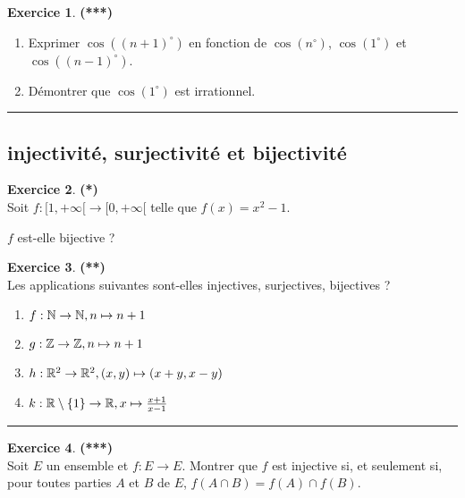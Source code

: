 \documentclass[a4paper,11pt]{article}
\theoremstyle{definition}
\newtheorem{exo}{Exercice} %
\begin{document}
\begin{minipage}{1\linewidth}
\begin{minipage}[t]{0.48\linewidth}
\begin{exo}\textbf{(***)}\quad\\[0.2cm]%
	\begin{enumerate}
		\item Exprimer $\cos((n+1)^\circ)$ en fonction de $\cos(n^\circ)$, $\cos(1^\circ)$ et $\cos((n-1)^\circ)$.
		\item Démontrer que $\cos(1^\circ)$	est irrationnel. 
	\end{enumerate}
	
	\centering
	\rule{1\linewidth}{0.6pt}
\end{exo}

\subsection*{injectivité, surjectivité et bijectivité}
\begin{exo}\textbf{(*)}\quad\\[0.2cm]
	Soit $f  : [1,+\infty[\rightarrow[0,+\infty[$ telle que
	$f(x)=x^2-1$. 
	
	$f$ est-elle bijective ?

\end{exo}



	\end{minipage}	
\hfill\vrule\hfill
\begin{minipage}[t]{0.48\linewidth}
\raggedright


\begin{exo}\textbf{(**)}\quad\\[0.2cm]
	Les applications suivantes sont-elles injectives, surjectives, bijectives ?
	\begin{enumerate}
		\item $f : {\mathbb{N}} \to {\mathbb{N}}, {n} \mapsto {n + 1}$
		\item $g : {\mathbb{Z}} \to {\mathbb{Z}}, {n}\mapsto{n + 1}$
		\item $h : {\mathbb{R}^2} \to {\mathbb{R}^2}, {(x, y)}\mapsto{ (x + y, x-y)}$
		\item $k : {\mathbb{R} \setminus \left\{ 1\right\}} \to {\mathbb{R}}, {x}\mapsto{\frac{x + 1}{x - 1}}$
	\end{enumerate}
	\centering
	\rule{1\linewidth}{0.6pt}
\end{exo}

\begin{exo}\textbf{(***)}\quad\\[0.2cm]
	Soit $E$ un ensemble et $f : E \rightarrow E $. Montrer que $f$ est injective si, et seulement si, pour toutes parties $A$ et
	$B$ de $E $, $f (A \cap B ) = f (A) \cap f (B )$.
	

\end{exo}
\end{minipage}
\end{minipage}
\end{document}
